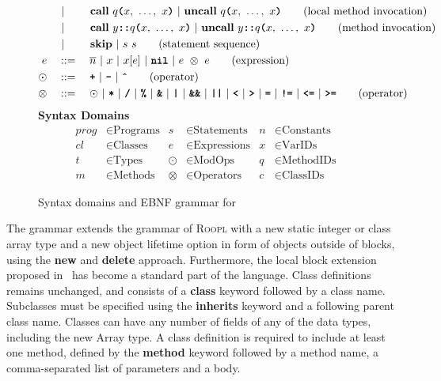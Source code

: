 \begin{figure}[h]
\begin{align}
    			&\ |\ \qquad \textbf{call}\ q\textbf{\texttt{(}}x,\ \dots,\ x\textbf{\texttt{)}}\ |\ \textbf{uncall}\ q\textbf{\texttt{(}}x,\ \dots,\ x\textbf{\texttt{)}}\tag{local method invocation}\\
    			&\ |\ \qquad \textbf{call}\ y\textbf{\texttt{::}}q\textbf{\texttt{(}}x,\ \dots,\ x\textbf{\texttt{)}}\ |\ \textbf{uncall}\ y\textbf{\texttt{::}}q\textbf{\texttt{(}}x,\ \dots,\ x\textbf{\texttt{)}}\tag{method invocation}\\
    			&\ |\ \qquad \textbf{skip}\ |\ s\ s\tag{statement sequence}\\
    e			\quad&::=\quad \overline{n}\ |\ x\ |\ x[e]\ |\ \textbf{\texttt{nil}}\ |\ e\ \otimes\ e\tag{expression}\\
    \odot	\quad&::=\quad \textbf{\texttt{+}}\ |\ \textbf{\texttt{-}}\ |\ \textbf{\texttt{\^}}\tag{operator}\\
    \otimes\quad&::=\quad \odot\ |\ \textbf{\texttt{*}}\ |\ \textbf{\texttt{/}}\ |\ \textbf{\texttt{\%}}\ |\ \textbf{\texttt{\&}}\ |\ \textbf{\texttt{|}}\ |\ \textbf{\texttt{\&\&}}\ |\ \textbf{\texttt{||}}\ |\ \textbf{\texttt{<}}\ |\ \textbf{\texttt{\textgreater}}\ |\ \textbf{\texttt{=}}\ |\ \textbf{\texttt{!=}}\ |\ \textbf{\texttt{<=}}\ |\ \textbf{\texttt{\textgreater=}}\tag{operator}
    \end{align}
    \vspace{2mm}
    \textbf{Syntax Domains}
    \begin{align*}
    prog &\in \text{Programs} & s &\in \text{Statements}      & n &\in \text{Constants} \\
    cl   &\in \text{Classes}  & e &\in \text{Expressions}     & x &\in \text{VarIDs}    \\
    t    &\in \text{Types}    & \odot &\in \text{ModOps}      & q &\in \text{MethodIDs} \\
    m    &\in \text{Methods}  & \otimes &\in \text{Operators} & c &\in \text{ClassIDs}
    \end{align*}
    \caption{Syntax domains and EBNF grammar for \rooplpp}
    \label{fig:roopl-grammar}
\end{figure}

The \rooplpp grammar extends the grammar of \textsc{Roopl}  with a new static integer or class array type and a new object lifetime option in form of objects outside of blocks, using the \textbf{new} and \textbf{delete} approach. Furthermore, the local block extension proposed in~\cite{th:roopl} has become a standard part of the language. Class definitions remains unchanged, and consists of a \textbf{class} keyword followed by a class name. Subclasses must be specified using the \textbf{inherits} keyword and a following parent class name. Classes can have any number of fields of any of the data types, including the new Array type. A class definition is required to include at least one method, defined by the \textbf{method} keyword followed by a method name, a comma-separated list of parameters and a body.

